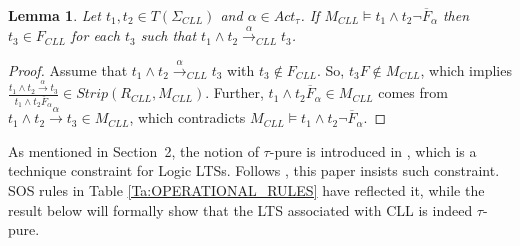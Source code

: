 \documentclass{elsarticle}
\theoremstyle{plain}
\newtheorem{lemma}[theorem]{Lemma}
\theoremstyle{definition}
\begin{document}
\begin{lemma}\label{L:CON_LLTS}
    Let $t_1,t_2\in T(\Sigma_{CLL})$ and $\alpha \in Act_{\tau}$. If $M_{CLL}\models t_1\wedge t_2 \neg\overline{F}_{\alpha}$ then
    $t_3\in F_{CLL}$ for each $t_3$ such that $t_1\wedge t_2 \stackrel{\alpha}{\longrightarrow}_{CLL}t_3$.
\end{lemma}
\begin{proof}
   Assume  that $t_1\wedge t_2 \stackrel{\alpha}{\longrightarrow}_{CLL}t_3$ with $t_3 \notin F_{CLL}$.
   So, $t_3F \notin M_{CLL}$, which implies $ \frac{t_1\wedge t_2 \stackrel{\alpha}{\longrightarrow}t_3}{t_1\wedge t_2 \overline{F}_{\alpha}}\in Strip(R_{CLL},M_{CLL})$. Further, $t_1\wedge t_2 \overline{F}_{\alpha} \in M_{CLL}$ comes from $t_1\wedge t_2 \stackrel{\alpha}{\longrightarrow} t_3 \in M_{CLL}$, which contradicts $M_{CLL}\models t_1\wedge t_2 \neg\overline{F}_{\alpha}$.
\end{proof}

As mentioned in Section~2, the notion of $\tau$-pure is introduced in \cite{Luttgen07, Luttgen10}, which is a technique constraint for Logic LTSs. Follows \cite{Luttgen07, Luttgen10}, this paper insists such constraint. SOS rules in Table \ref{Ta:OPERATIONAL_RULES} have reflected it, while the result below will formally show that the LTS associated with CLL is indeed $\tau$-pure.
\end{document}
